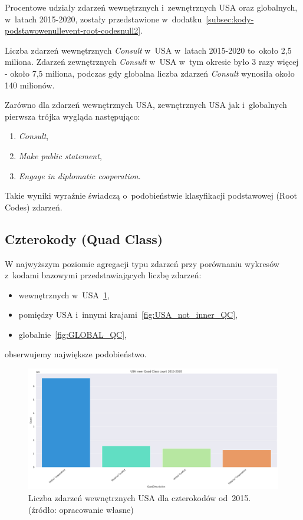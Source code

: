 \documentclass[11pt]{report}
\begin{document}
    Procentowe udziały zdarzeń wewnętrznych i~zewnętrznych USA oraz globalnych, w~latach 2015-2020, zostały przedstawione
    w~dodatku~\ref{subsec:kody-podstawowenullevent-root-codesnull2}.

    Liczba zdarzeń wewnętrznych \textit{Consult} w~USA w~latach 2015-2020 to~około 2,5 miliona.
    Zdarzeń zewnętrznych \textit{Consult} w~USA w~tym okresie było 3 razy więcej - około 7,5 miliona,
    podczas gdy globalna liczba zdarzeń \textit{Consult} wynosiła około 140 milionów.

    Zarówno dla zdarzeń wewnętrznych USA, zewnętrznych USA jak i~globalnych pierwsza trójka wygląda następująco:
    \begin{enumerate}
        \item \textit{Consult},
        \item \textit{Make public statement},
        \item \textit{Engage in diplomatic cooperation}.
    \end{enumerate}

    Takie wyniki wyraźnie świadczą o~podobieństwie klasyfikacji podstawowej (Root Codes) zdarzeń.

    \subsection{Czterokody (Quad Class)}\label{subsec:czterokodynullquad-classnull}

    W najwyższym poziomie agregacji typu zdarzeń przy porównaniu wykresów z~kodami bazowymi przedstawiających liczbę zdarzeń:
    \begin{itemize}
        \item wewnętrznych w~USA~\ref{fig:USA_inner_QC},
        \item pomiędzy USA i~innymi krajami~\ref{fig:USA_not_inner_QC},
        \item globalnie~\ref{fig:GLOBAL_QC},
    \end{itemize}
    obserwujemy największe podobieństwo.

    \begin{figure}[tp]
        \centering
        \includegraphics[width=\linewidth]{fig/USA inner/QC.png}
        \caption{Liczba zdarzeń wewnętrznych USA dla czterokodów od~2015. (źródło: opracowanie własne)}
        \label{fig:USA_inner_QC}
    \end{figure}
\end{document}
